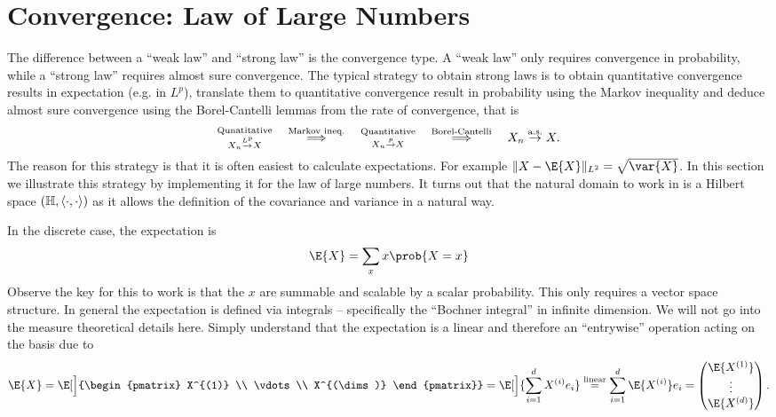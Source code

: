 \section{Convergence: Law of Large Numbers}
\label{sec: law of large numbers}

The difference between a ``weak law'' and ``strong law'' is the convergence type.
A ``weak law'' only requires convergence in probability, while a ``strong law''
requires almost sure convergence. The typical strategy to obtain strong laws is
to obtain quantitative convergence results in expectation (e.g. in \(L^p\)), translate them
to quantitative convergence result in probability using the Markov inequality
and deduce almost sure convergence using the Borel-Cantelli lemmas from
the rate of convergence, that is
\[\begin{aligned}
    \substack{\text{Qunatitative}\\ X_n \overset{L^p}\to X } \quad
    \overset{\text{Markov ineq.}}\implies \quad \substack{\text{Quantitative}\\ X_n \overset{p}\to X}\quad
    \overset{\text{Borel-Cantelli}}\implies \quad X_n \overset{\operatorname{\text{a.s.}}}\to X.
\end{aligned}
\]
The reason for this strategy is that it is often easiest to calculate
expectations.  For example \(\norm{X - \E{X}}_{L^2} = \sqrt{\var{X}}\). 
In this section we illustrate this strategy by implementing it for the
law of large numbers. It turns out that the natural domain to work in
is a Hilbert space \((\mathbb{H}, \langle\cdot, \cdot\rangle)\) as it allows
the definition of the covariance and variance in a natural way.

\begin{remark}
    \label{rem: expectation in multiple dimensions}
    In the discrete case, the expectation is
    \[
        \E{X} = \sum_{x} x \prob{X = x}
    \]
    Observe the key for this to work is that the \(x\) are summable and scalable
    by a scalar probability. This only requires a vector space structure.  
    In general the expectation is defined via integrals -- specifically the
    ``Bochner integral'' in infinite dimension. We will not go into the measure
    theoretical details here. Simply understand that the expectation is a linear
    and therefore an ``entrywise'' operation acting on the basis due to
    \[
        \E{X}
        = \E[\Big]{\begin{pmatrix}
            X^{(1)} \\
            \vdots \\
            X^{(\dims)}
        \end{pmatrix}}
        = \E[\Big]{\sum_{i=1}^\dims X^{(i)} e_i}
        \overset{\text{linear}}= \sum_{i=1}^\dims \E{X^{(i)}} e_i
        = \begin{pmatrix}
            \E{X^{(1)}} \\
            \vdots \\
            \E{X^{(\dims)}}
        \end{pmatrix}.
    \]
\end{remark}

